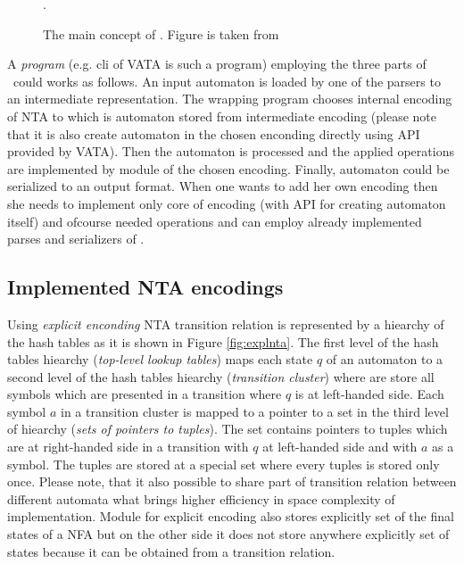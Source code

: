 \begin{figure}[bt]
\begin{center}

		\caption{The main concept of \vata. Figure is taken from \cite{tacas12}}.
		\label{fig:vata}
\end{center}
\end{figure}

A \emph{program} (e.g. cli of VATA is such a program) employing the three parts of \vata\ could works as follows.
An input automaton is loaded by one of the parsers to an intermediate representation.
The wrapping program chooses internal encoding of NTA to which is automaton stored from intermediate encoding (please note that it is also
create automaton in the chosen enconding directly using API provided by VATA).
Then the automaton is processed and the applied operations are implemented by module of the chosen encoding.
Finally, automaton could be serialized to an output format.
When one wants to add her own encoding then she needs to implement only core of encoding (with API for creating automaton itself)
and ofcourse needed operations and can employ already implemented parses and serializers of \vata.

\subsection{Implemented NTA encodings}

Using \emph{explicit enconding} NTA transition relation is represented by a hiearchy of the hash tables as it is shown in Figure \ref{fig:explnta}.
The first level of the hash tables hiearchy (\emph{top-level lookup tables}) maps each state $q$ of an automaton to 
a second level of the hash tables hiearchy (\emph{transition cluster}) where are store all symbols which
are presented in a transition where $q$ is at left-handed side.
Each symbol $a$ in a transition cluster is mapped to a pointer to a set in the third level of hiearchy (\emph{sets of pointers to tuples}).
The set contains pointers to tuples which are at right-handed side in a transition with $q$ at left-handed side and with $a$ as a symbol.
The tuples are stored at a special set where every tuples is stored only once.
Please note, that it also possible to share part of transition relation between different automata what
brings higher efficiency in space complexity of implementation.
Module for explicit encoding also stores explicitly set of the final states of a NFA but on
the other side it does not store anywhere explicitly set of states because it can be obtained from a transition relation.

